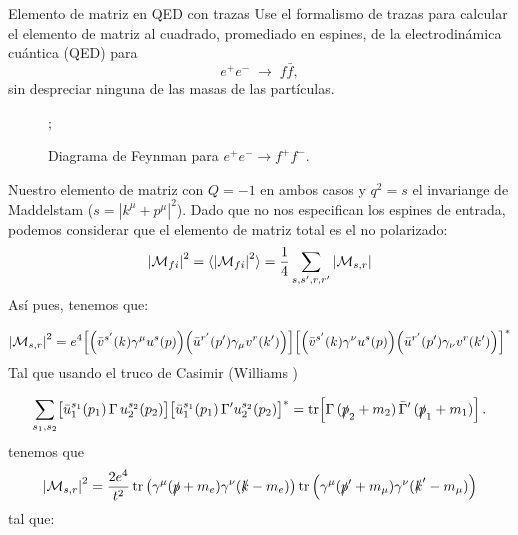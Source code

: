 

\begin{Ejercicio}{Elemento de matriz en QED con trazas}\label{Ej:07}
	Use el formalismo de trazas para calcular el elemento de matriz al cuadrado, promediado en espines, de la electrodinámica cuántica (QED) para
	\[
		e^+ e^- \;\to\; f \bar{f},
	\]
	sin despreciar ninguna de las masas de las partículas.
\end{Ejercicio}

\begin{figure}[h]
	\centering
	;
	\caption{Diagrama de Feynman para \(e^+ e^- \to f^+ f^-\).}
\end{figure}
Nuestro elemento de matriz
con $Q=-1$ en ambos casos y $q^2=s$ el invariange de Maddelstam ($s=|k^\mu+p^\mu|^2$). Dado que no nos especifican los espines de entrada, podemos considerar que el elemento de matriz total es el no polarizado:
\begin{equation}
	\vqty{\Mcal_{fi}}^2 = \langle \vqty{\Mcal_{fi}}^2 \rangle = \frac{1}{4} \sum_{s,s',r,r'} \vqty{\Mcal_{s,r}}
\end{equation}
Así pues, tenemos que:

\begin{equation}
	\vqty{\Mcal_{s,r}}^2 = e^4 \bqty{\pqty{\bar{v}^{s'}(k) \gamma^\mu u^{s}(p)}\pqty{\bar{u}^{r'}(p') \gamma_\mu v^{r}(k')}} \bqty{\pqty{\bar{v}^{s'}(k) \gamma^\nu u^{s}(p)}\pqty{\bar{u}^{r'}(p')\gamma_\nu v^{r}(k')}}^*
\end{equation}
Tal que usando el truco de Casimir (Williams \cite{Williams_2022})

\[
	\sum_{s_1,s_2}
	\bigl[\bar{u}_1^{s_1}(p_1)\,\Gamma\,u_2^{s_2}(p_2)\bigr]
	\bigl[\bar{u}_1^{s_1}(p_1)\,\Gamma' u_2^{s_2}(p_2)\bigr]^*
	= \mathrm{tr}\!\left[ \Gamma \,(\slashed{p}_2+m_2)\,\bar{\Gamma}'\,(\slashed{p}_1+m_1) \right].
\]
tenemos que
\begin{equation}
	\vqty{\Mcal_{s,r}}^2 =\frac{2e^4}{t^2} \tr \pqty{\gamma^\mu (\pslash+m_e)\gamma^\nu (\kslash-m_e)}\tr \pqty{\gamma^\mu (\pslash'+m_\mu)\gamma^\nu (\kslash'-m_\mu)}
\end{equation}
tal que:

